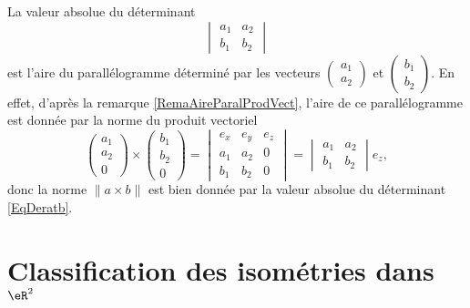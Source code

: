 La valeur absolue du déterminant 
\begin{equation}        \label{EqDeratb}
    \begin{vmatrix}
        a_1    &   a_2    \\ 
        b_1    &   b_2    
    \end{vmatrix}
\end{equation}
est l'aire du parallélogramme déterminé par les vecteurs $\begin{pmatrix}
    a_1    \\ 
    a_2    
\end{pmatrix}$ et $\begin{pmatrix}
    b_1    \\ 
    b_2    
\end{pmatrix}$. En effet, d'après la remarque \ref{RemaAireParalProdVect}, l'aire de ce parallélogramme est donnée par la norme du produit vectoriel
\begin{equation}
    \begin{pmatrix}
        a_1    \\ 
        a_2    \\ 
        0    
    \end{pmatrix}\times
    \begin{pmatrix}
          b_1  \\ 
        b_2    \\ 
        0    
    \end{pmatrix}=\begin{vmatrix}
        e_x    &   e_y    &   e_z    \\
        a_1    &   a_2    &   0    \\
        b_1    &   b_2    &   0
    \end{vmatrix}=
    \begin{vmatrix}
        a_1    &   a_2    \\ 
        b_1    &   b_2    
    \end{vmatrix}e_z,
\end{equation}
donc la norme $\| a\times b \|$ est bien donnée par la valeur absolue du déterminant \eqref{EqDeratb}.

\section{Classification des isométries dans \( \eR^2\)}

